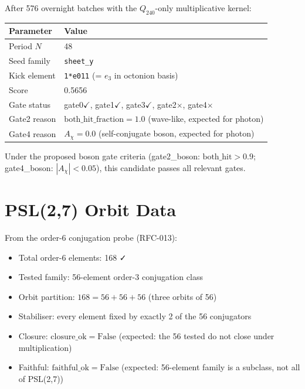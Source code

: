 After 576 overnight batches with the $Q_{240}$-only multiplicative kernel:
\begin{center}
\begin{tabular}{ll}
  \toprule
  Parameter & Value \\
  \midrule
  Period $N$ & 48 \\
  Seed family & \texttt{sheet\_y} \\
  Kick element & \texttt{1*e011} (= $e_3$ in octonion basis) \\
  Score & 0.5656 \\
  Gate status & gate0$\checkmark$, gate1$\checkmark$, gate3$\checkmark$, gate2$\times$, gate4$\times$ \\
  Gate2 reason & $\mathrm{both\_hit\_fraction} = 1.0$ (wave-like, expected for photon) \\
  Gate4 reason & $A_\chi = 0.0$ (self-conjugate boson, expected for photon) \\
  \bottomrule
\end{tabular}
\end{center}

Under the proposed boson gate criteria (gate2\_boson: $\mathrm{both\_hit} > 0.9$;
gate4\_boson: $|A_\chi| < 0.05$), this candidate passes all relevant gates.

\section{PSL(2,7) Orbit Data}
\label{app:psl27}

From the order-6 conjugation probe (RFC-013):
\begin{itemize}
  \item Total order-6 elements: 168 ✓
  \item Tested family: 56-element order-3 conjugation class
  \item Orbit partition: $168 = 56 + 56 + 56$ (three orbits of 56)
  \item Stabiliser: every element fixed by exactly 2 of the 56 conjugators
  \item Closure: $\mathrm{closure\_ok} = \mathrm{False}$ (expected: the 56 tested do not
        close under multiplication)
  \item Faithful: $\mathrm{faithful\_ok} = \mathrm{False}$ (expected: 56-element family is
        a subclass, not all of PSL(2,7))
\end{itemize}

